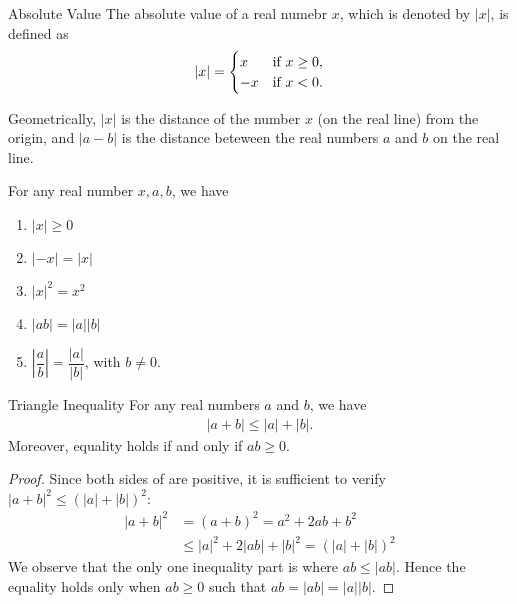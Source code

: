
\begin{mysubsection}{}
    \begin{definition}[def:]{Absolute Value}
        The absolute value of a real numebr $x$, which is denoted by $\left|x\right|$, is defined as
        \begin{alignat*}{1}
            \left|x\right|=\begin{cases}
                x&\textnormal{if } x\geq 0,\\
                -x&\textnormal{if }x<0.
            \end{cases}
        \end{alignat*}
    \end{definition}
    Geometrically, $\left|x\right|$ is the distance of the number $x$ (on the real line) from the origin, and $\left|a-b\right|$ is the distance beteween the real numbers $a$ and $b$ on the real line.

    For any real number $x,a,b$, we have
    \begin{multicols}{3}
    \begin{enumerate}
        \item $\left|x\right|\geq 0$
        \item $\left|-x\right|=\left|x\right|$
        \item $\left|x\right|^2=x^2$
        \item $\left|ab\right|=\left|a\right|\left|b\right|$
        \item $\left|\dfrac{a}{b}\right|=\dfrac{\left|a\right|}{\left|b\right|}$, with $b\neq 0$.
    \end{enumerate}
    \end{multicols}

    \begin{theorem}[thm:]{Triangle Inequality}
        For any real numbers $a$ and $b$, we have
        \begin{alignat*}{1}
            \left|a+b\right|\leq \left|a\right|+\left|b\right|.
        \end{alignat*}
        Moreover, equality holds if and only if $ab\geq 0$.
    \end{theorem}

    \begin{proof}
        Since both sides of are positive, it is sufficient to verify $\left|a+b\right|^2\leq (\left|a\right|+\left|b\right|)^2$:
        \begin{alignat*}{1}
            \left|a+b\right|^2&= (a+b)^2=a^2+2ab+b^2\\
                              &\leq \left|a\right|^2+2\left|ab\right|+\left|b\right|^2=(\left|a\right|+\left|b\right|)^2
        \end{alignat*}
        We observe that the only one inequality part is where $ab\leq \left|ab\right|$.  Hence the equality holds only when $ab\geq 0$ such that $ab=\left|ab\right|=\left|a\right|\left|b\right|$.
    \end{proof}
\end{mysubsection}

